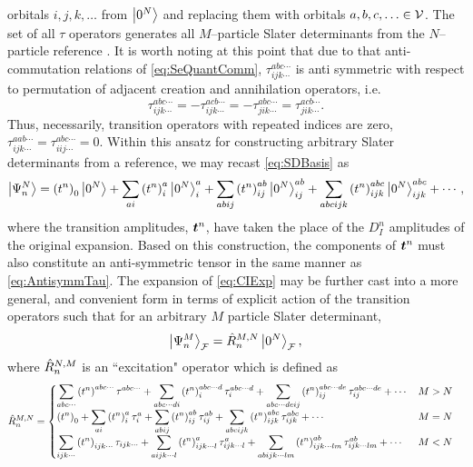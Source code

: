 orbitals $i,j,k,\ldots$ from $\left\vert 0^N \right\rangle$ and replacing them with orbitals $a,b,c,\ldots \in \mathcal{V}$. The set of all
$\tau$ operators generates all $M$--particle Slater determinants from the $N$--particle reference .
It is worth noting at this point that due to that anti-commutation relations of \cref{eq:SeQuantComm}, $\tau^{abc\cdots}_{ijk\cdots}$
is anti symmetric with respect to permutation of adjacent creation and annihilation operators, i.e.
\begin{equation}
  \label{eq:AntisymmTau}
  \tau^{abc\cdots}_{ijk\cdots} = - \tau^{acb\cdots}_{ijk\cdots} = - \tau^{abc\cdots}_{jik\cdots} = \tau^{acb\cdots}_{jik\cdots}.
\end{equation} 
Thus, necessarily, transition operators with repeated indices are zero, $\tau^{aab\cdots}_{ijk\cdots} = \tau^{abc\cdots}_{iij\cdots} = 0$.
Within this ansatz for constructing arbitrary Slater determinants from a reference, we may recast \cref{eq:SDBasis} 
as
\begin{equation}
  \label{eq:CIExp}
  \left\vert \Psi^N_n \right\rangle = \left(t^n\right)_0\left\vert 0^N \right\rangle + \sum_{ai} \left(t^n\right)_i^a \left\vert 0^N \right\rangle_i^a + 
                   \sum_{abij} \left(t^n\right)_{ij}^{ab} \left\vert 0^N \right\rangle_{ij}^{ab} + \sum_{abcijk} \left(t^n\right)_{ijk}^{abc} \left\vert 0^N \right\rangle_{ijk}^{abc} + \cdots,
\end{equation}
where the transition amplitudes, $\boldsymbol{t}^n$, have taken the place of the $D^n_I$ amplitudes of the original expansion. Based on this
construction, the components of $\boldsymbol{t}^n$ must also constitute an anti-symmetric tensor in the same manner as \cref{eq:AntisymmTau}.
The expansion of 
\cref{eq:CIExp} may be further cast into a more general, and convenient form in terms of explicit action of the transition
operators such that for an arbitrary $M$ particle Slater determinant,
\begin{equation}
  \label{eq:ExcitationOp}
  \left\vert \Psi^M_n \right\rangle_{\mathcal{F}} = \hat{R}_n^{M,N} \left\vert 0^N \right\rangle_{\mathcal{F}},
\end{equation}
where $\hat{R}_n^{N,M}$ is an ``excitation" operator which is defined as
\begin{align}
&\hat{R}_n^{M,N} = 
  \begin{cases}
    \displaystyle \sum_{abc\cdots} \left( t^n \right)^{abc\cdots} \tau^{abc\cdots} + \sum_{abc\cdots di} \left( t^n \right)^{abc\cdots d}_i \tau^{abc\cdots d}_i +
      \sum_{abc\cdots deij} \left( t^n \right)^{abc\cdots de}_{ij} \tau^{abc\cdots de}_{ij} + \cdots & M > N \\
    \displaystyle\left( t^n \right)_0  + \sum_{ai} \left( t^n \right)^{a}_i \tau^{a}_i +
      \sum_{abij} \left( t^n \right)^{ab}_{ij} \tau^{ab}_{ij} + \sum_{abcijk} \left( t^n \right)^{abc}_{ijk} \tau^{abc}_{ijk} + \cdots & M = N \\
    \displaystyle \sum_{ijk\cdots} \left( t^n \right)_{ijk\cdots} \tau_{ijk\cdots} + \sum_{a ijk\cdots l} \left( t^n \right)^{a}_{ijk\cdots l} \tau^{a}_{ijk\cdots l} +
      \sum_{abijk\cdots lm} \left( t^n \right)^{ab}_{ijk\cdots lm} \tau^{ab}_{ijk\cdots lm} + \cdots & M < N \\
  \end{cases}
\end{align}
